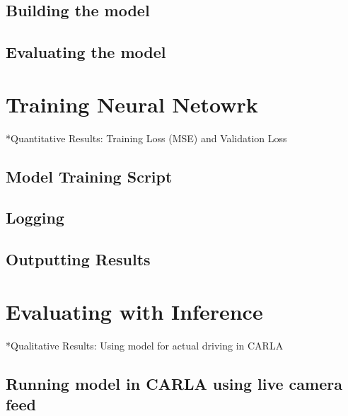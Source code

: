 \documentclass{article} %
\begin{document}
\subsection{Building the model}

\subsection{Evaluating the model}



\section{Training Neural Netowrk}

*Quantitative Results: Training Loss (MSE) and Validation Loss

\subsection{Model Training Script}

\subsection{Logging}

\subsection{Outputting Results}



\section{Evaluating with Inference}

*Qualitative Results: Using model for actual driving in CARLA

\subsection{Running model in CARLA using live camera feed}
\end{document}
